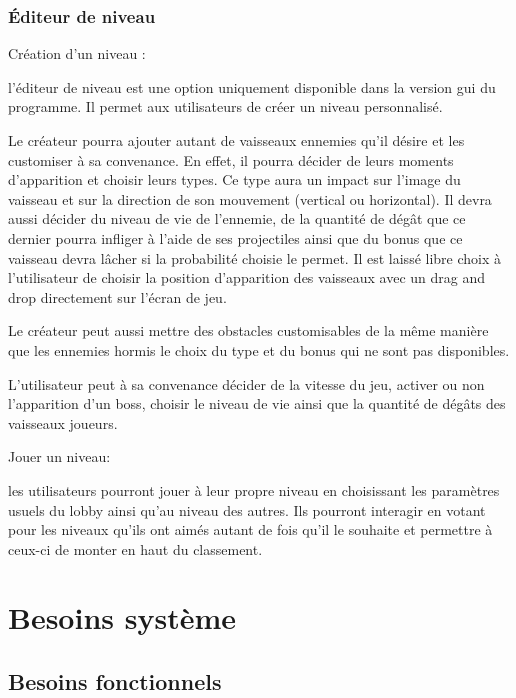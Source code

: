 \documentclass[a4paper,12pt]{article}
\begin{document}
\subsubsection{Éditeur de niveau}

Création d'un niveau : 

l'éditeur de niveau est une option uniquement disponible dans la version gui du programme. Il permet aux utilisateurs de créer un niveau personnalisé.

Le créateur pourra ajouter autant de vaisseaux ennemies qu'il désire et les customiser à sa convenance.
En effet, il pourra décider de leurs moments d'apparition et choisir leurs types. Ce type aura un impact sur l'image du vaisseau et sur la direction de son mouvement (vertical ou horizontal). Il devra aussi décider du niveau de vie de l'ennemie, de la quantité de dégât que ce dernier pourra infliger à l'aide de ses projectiles ainsi que du bonus que ce vaisseau devra lâcher si la probabilité choisie le permet. Il est laissé libre choix à l'utilisateur de choisir la position d'apparition des vaisseaux avec un drag and drop directement sur l'écran de jeu. 

Le créateur peut aussi mettre des obstacles customisables de la même manière que les ennemies hormis le choix du type et du bonus qui ne sont pas disponibles. 

L'utilisateur peut à sa convenance décider de la vitesse du jeu, activer ou non l'apparition d'un boss, choisir le niveau de vie ainsi que la quantité de dégâts des vaisseaux joueurs. 

Jouer un niveau: 

les utilisateurs pourront jouer à leur propre niveau en choisissant les paramètres usuels du lobby ainsi qu'au niveau des autres. Ils pourront interagir en votant pour les niveaux qu'ils ont aimés autant de fois qu'il le souhaite et permettre à ceux-ci de monter en haut du classement. 

\newpage



\newpage

\section{Besoins système}
\subsection{Besoins fonctionnels}
\end{document}
